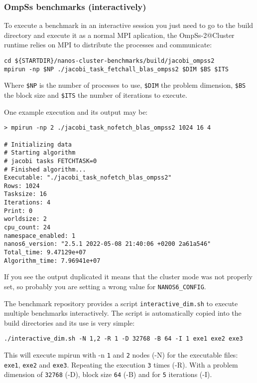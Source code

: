 \documentclass{article}
\newcommand{\code}[1]{\texttt{#1}}
\begin{document}
\subsubsection{OmpSs benchmarks (interactively)}
To execute a benchmark in an interactive session you just need to go
to the build directory and execute it as a normal MPI aplication, the
OmpSs-2@Cluster runtime relies on MPI to distribute the processes and
communicate:

\begin{lstlisting}
cd ${STARTDIR}/nanos-cluster-benchmarks/build/jacobi_ompss2
mpirun -np $NP ./jacobi_task_fetchall_blas_ompss2 $DIM $BS $ITS
\end{lstlisting}

Where \code{\$NP} is the number of processes to use, \code{\$DIM} the
problem dimension, \code{\$BS} the block size and \code{\$ITS} the
number of iterations to execute.

One example execution and its output may be:
\begin{lstlisting}
> mpirun -np 2 ./jacobi_task_nofetch_blas_ompss2 1024 16 4

# Initializing data
# Starting algorithm
# jacobi tasks FETCHTASK=0
# Finished algorithm...
Executable: "./jacobi_task_nofetch_blas_ompss2"
Rows: 1024
Tasksize: 16
Iterations: 4
Print: 0
worldsize: 2
cpu_count: 24
namespace_enabled: 1
nanos6_version: "2.5.1 2022-05-08 21:40:06 +0200 2a61a546"
Total_time: 9.47129e+07
Algorithm_time: 7.96941e+07
\end{lstlisting}

If you see the output duplicated it means that the cluster mode was
not properly set, so probably you are setting a wrong value for \code{NANOS6\_CONFIG}.

The benchmark repository provides a script \code{interactive\_dim.sh}
to execute multiple benchmarks interactively. The script is
automatically copied into the build directories and its use is very
simple:

\begin{lstlisting}
./interactive_dim.sh -N 1,2 -R 1 -D 32768 -B 64 -I 1 exe1 exe2 exe3
\end{lstlisting}

This will execute mpirun with -n \code{1} and \code{2} nodes (-N) for
the executable files: \code{exe1}, \code{exe2} and
\code{exe3}. Repeating the execution \code{3} times (-R). With a
problem dimension of \code{32768} (-D), block size \code{64} (-B) and
for \code{5} iterations (-I).
\end{document}
